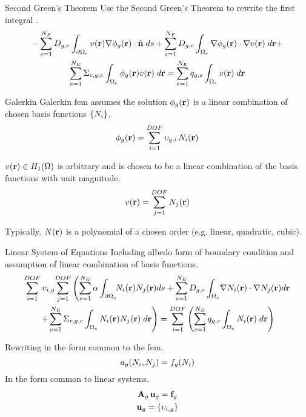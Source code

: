 \begin{frame}{Second Green's Theorem}
  Use the Second Green's Theorem to rewrite the first integral
  \cite{textbookli}.
  \begin{multline} 
    -\sum_{e=1}^{N_E} D_{g,e} \int_{\partial \Omega_e} v(\mathbf{r}) \mathbf{\nabla}
    \phi_g(\mathbf{r}) \cdot \hat{\mathbf{n}} \;ds + \sum_{e=1}^{N_E} 
      D_{g,e} \int_{\Omega_e} \mathbf{\nabla} \phi_g(\mathbf{r}) \cdot \mathbf{\nabla} v(\mathbf{r}) 
      \; d\mathbf{r} + \\
      \sum_{e=1}^{N_E} \Sigma_{r,g,e} \int_{\Omega_e} \phi_g(\mathbf{r}) v(\mathbf{r}) 
     \; d\mathbf{r} =
      \sum_{e=1}^{N_E} q_{g,e} \int_{\Omega_e} v(\mathbf{r}) \; d\mathbf{r}
  \end{multline}
\end{frame}

\begin{frame}{Galerkin }
  Galerkin \gls{fem} assumes the solution $\phi_g(\mathbf{r})$ is a linear
  combination of chosen basis functions $\{N_i\}$.
  \begin{equation} 
    \label{eq:linear_combination}
    \phi_g(\mathbf{r}) = \sum_{i=1}^{DOF} \upsilon_{g,i} \, N_i(\mathbf{r})
  \end{equation}

  $v(\mathbf{r}) \in H_1(\Omega)$ is arbitrary and is chosen to be a
  linear combination of the basis functions with unit magnitude.
  \begin{equation} 
    \label{eq:linear_superposition}
    v(\mathbf{r}) = \sum_{j=1}^{DOF} N_j(\mathbf{r})
  \end{equation}

  Typically, $N(\mathbf{r})$ is a polynomial of a chosen order (e.g. linear,
  quadratic, cubic).
\end{frame}

\begin{frame}{Linear System of Equations}
  Including albedo form of boundary condition and assumption of 
  linear combination of basis functions.
  \begin{multline}
    \label{eq:linear_equation}
    \sum_{i=1}^{DOF} \upsilon_{i,g} \! \sum_{j=1}^{DOF} \left(
      \sum_{e=1}^{N_E} \alpha \int_{\partial \Omega_e} \! \!
      N_i(\mathbf{r})  N_j(\mathbf{r}) ds +
      \sum_{e=1}^{N_E} D_{g,e} 
      \int_{\Omega_e} \! \mathbf{\nabla} N_i(\mathbf{r}) \cdot \mathbf{\nabla} N_j(\mathbf{r}) d\mathbf{r}
    \right.
    \\
    \left.
      +
      \sum_{e=1}^{N_E} \Sigma_{r,g,e}
      \int_{\Omega_e} N_i(\mathbf{r}) N_j(\mathbf{r}) \; d\mathbf{r} \right) 
      =
      \sum_{i=1}^{DOF} \left(
      \sum_{e=1}^{N_E} q_{g,e} 
      \int_{\Omega_e} N_i(\mathbf{r}) \; d\mathbf{r} \right)
  \end{multline}

  Rewriting in the form common to the \gls{fem}.
  \begin{equation}
    \label{eq:fem_notation}
    a_g(N_i,N_j) = f_g(N_i)
  \end{equation}
  In the form common to linear systems.
  \begin{gather}
    \label{eq:matrix_notation}
    \mathbf{A}_g \, \mathbf{u}_g = \mathbf{f}_g \\
    \mathbf{u}_g = \{\upsilon_{i,g}\}
  \end{gather}
\end{frame}

